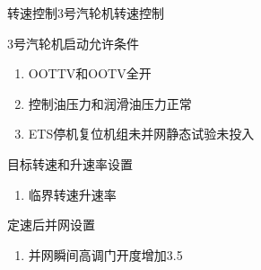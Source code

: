 \documentclass[12pt,hyperref={CJKbookmarks=true}]{beamer} %
\begin{document}
\begin{frame}{转速控制}{3号汽轮机转速控制}
\begin{block}{\heiti 3号汽轮机启动允许条件}
			\begin{enumerate}
				\item OOTTV和OOTV全开
				\item 控制油压力和润滑油压力正常
				\item ETS停机复位机组未并网静态试验未投入
		\end{enumerate}
		\end{block}
\begin{block}{\heiti 目标转速和升速率设置}
			\begin{enumerate}
				\item 临界转速升速率
		\end{enumerate}
		\end{block}
\begin{block}{\heiti 定速后并网设置}
			\begin{enumerate}
				\item 并网瞬间高调门开度增加3.5
		\end{enumerate}
		\end{block}
\end{frame}
\end{document}
